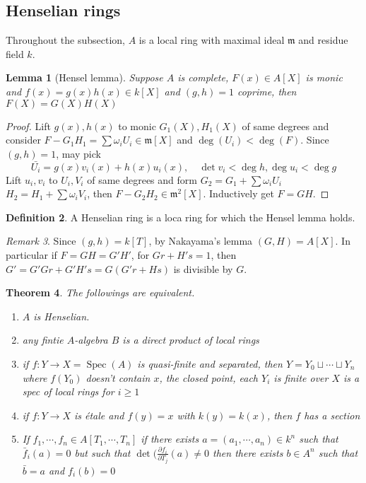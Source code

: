 \documentclass[leqno]{amsart}
\DeclareMathOperator{\Spec}{Spec}
\newcommand{\1}{\mathbf{1}}
\newcommand{\fm}{\mathfrak m}
\newtheorem{thm}{Theorem}[section]
\newtheorem{lem}[thm]{Lemma}
\theoremstyle{definition}
\newtheorem{defn}[thm]{Definition}
\theoremstyle{remark}
\newtheorem{rem}[thm]{Remark}
\begin{document}
\subsection{Henselian rings}

Throughout the subsection,
$A$ is a local ring with maximal ideal  $\fm$
and residue field  $k$.
\begin{lem}[Hensel lemma]
	Suppose $A$ is complete, 
	$F(x)\in A[X]$ is monic and 
	$f(x)=g(x)h(x)\in k[X]$ and  $(g,h)=1$ coprime,
	then  $F(X)=G(X)H(X)$
\end{lem}
\begin{proof}
	Lift $g(x), h(x)$ to monic  $G_1(X),H_1(X)$
	of same degrees and consider
	$F-G_1H_1=\sum \omega_iU_i\in \fm[X]$ 
	and $\deg(U_i)<\deg(F)$.
	Since  $(g,h)=1$, may pick
	 \[
		 \bar{U_i}=g(x)v_i(x)+h(x)u_i(x),\quad
		 \det v_i<\deg h,\deg u_i<\deg g
	\]
	Lift $u_i,v_i$ to  $U_i,V_i$ of same degrees
	and form  $G_2=G_1+\sum\omega_iU_i$
	 $H_2=H_1+\sum\omega_iV_i$,
	 then  $F-G_2H_2\in\fm^2[X]$.
	 Inductively get  $F=GH$.
\end{proof}
\begin{defn}
	A Henselian ring is a loca ring 
	for which the Hensel lemma holds.
\end{defn}
\begin{rem}
	Since $(g,h)=k[T]$,
	by Nakayama's lemma  $(G,H)=A[X]$.
	In particular if  $F=GH=G'H'$,
	for  $Gr+H's=1$,
	then  $G'=G'Gr+G'H's=G(G'r+Hs)$
	is divisible by  $G$.
\end{rem}

\begin{thm}
	The followings are equivalent.
	\begin{enumerate}[label=(\alph*)]
		\item $A$ is Henselian.
		\item any fintie  $A$-algebra  $B$
			is a direct product of local rings
		\item if  $f\colon Y\to X=\Spec(A)$ is quasi-finite
			and separated,
			then $Y=Y_0\sqcup\cdots\sqcup Y_n$
			where $f(Y_0)$ doesn't contain $x$,
			the closed point, 
			each $Y_i$ is finite over  $X$
			is a spec of local rings for  $i\geq 1$
		\item if $f\colon Y\to X$ is \'{e}tale
			and $f(y)=x$ with  $k(y)=k(x)$,
			then  $f$ has a section
		\item If  $f_1,\cdots,f_n\in A[T_1,\cdots,T_n]$
			if there exists $a=(a_1,\cdots,a_n)\in k^n$
			such that  $\bar{f}_i(a)=0$ 
			but such that 
			$\det(\frac{\partial f_i}
			{\partial T_j}(a)\neq 0$ 
			then there exists $b\in A^n$
			such that  $\bar{b}=a$ 
			and $f_i(b)=0$
	\end{enumerate}
\end{thm}
\end{document}
